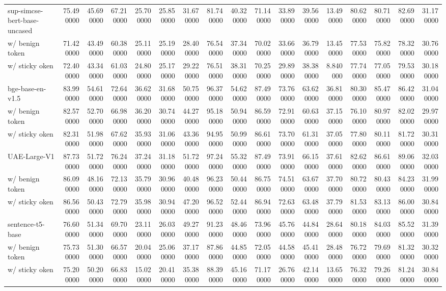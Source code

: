\begin{tabular}{lrrrrrrrrrrrrrrrr}
sup-simcse-bert-base-uncased & 75.490000 & 45.690000 & 67.210000 & 25.700000 & 25.850000 & 31.670000 & 81.740000 & 40.320000 & 71.140000 & 33.890000 & 39.560000 & 13.490000 & 80.620000 & 80.710000 & 82.690000 & 31.170000 \\
w/ benign token & 71.420000 & 43.490000 & 60.380000 & 25.110000 & 25.190000 & 28.400000 & 76.540000 & 37.340000 & 70.020000 & 33.660000 & 36.790000 & 13.450000 & 77.530000 & 75.820000 & 78.320000 & 30.760000 \\
w/ sticky oken & 72.400000 & 43.340000 & 61.030000 & 24.800000 & 25.170000 & 29.220000 & 76.510000 & 38.310000 & 70.250000 & 29.890000 & 38.380000 & 8.840000 & 77.740000 & 77.050000 & 79.530000 & 30.180000 \\
bge-base-en-v1.5 & 83.990000 & 54.610000 & 72.640000 & 36.620000 & 31.680000 & 50.750000 & 96.370000 & 54.620000 & 87.490000 & 73.760000 & 63.620000 & 36.810000 & 80.300000 & 85.470000 & 86.420000 & 31.040000 \\
w/ benign token & 82.570000 & 52.700000 & 66.980000 & 36.200000 & 30.740000 & 44.270000 & 95.180000 & 50.940000 & 86.590000 & 72.910000 & 60.630000 & 37.150000 & 76.100000 & 80.970000 & 82.020000 & 29.970000 \\
w/ sticky oken & 82.310000 & 51.980000 & 67.620000 & 35.930000 & 31.060000 & 43.360000 & 94.950000 & 50.990000 & 86.610000 & 73.700000 & 61.310000 & 37.050000 & 77.800000 & 80.110000 & 81.720000 & 30.310000 \\
UAE-Large-V1 & 87.730000 & 51.720000 & 76.240000 & 37.240000 & 31.180000 & 51.720000 & 97.240000 & 55.320000 & 87.490000 & 73.910000 & 66.150000 & 37.610000 & 82.620000 & 86.610000 & 89.060000 & 32.030000 \\
w/ benign token & 86.090000 & 48.160000 & 72.130000 & 35.790000 & 30.960000 & 40.480000 & 96.230000 & 50.440000 & 86.750000 & 74.510000 & 63.670000 & 37.700000 & 80.720000 & 80.430000 & 84.230000 & 31.990000 \\
w/ sticky oken & 86.560000 & 50.430000 & 72.790000 & 35.980000 & 30.940000 & 47.200000 & 96.520000 & 52.440000 & 86.940000 & 72.630000 & 63.480000 & 37.790000 & 81.530000 & 83.130000 & 86.000000 & 30.840000 \\
sentence-t5-base & 76.600000 & 51.340000 & 69.700000 & 23.110000 & 26.030000 & 49.270000 & 91.230000 & 48.460000 & 73.960000 & 45.760000 & 44.840000 & 28.640000 & 80.180000 & 84.030000 & 85.520000 & 31.390000 \\
w/ benign token & 75.730000 & 51.300000 & 66.570000 & 20.040000 & 25.060000 & 37.170000 & 87.860000 & 44.850000 & 72.050000 & 44.580000 & 45.410000 & 28.480000 & 76.720000 & 79.690000 & 81.320000 & 30.320000 \\
w/ sticky oken & 75.200000 & 50.200000 & 66.830000 & 15.020000 & 20.410000 & 35.380000 & 88.390000 & 45.160000 & 71.170000 & 26.760000 & 42.140000 & 13.650000 & 76.320000 & 79.260000 & 81.240000 & 30.840000 \\
\bottomrule
\end{tabular}
